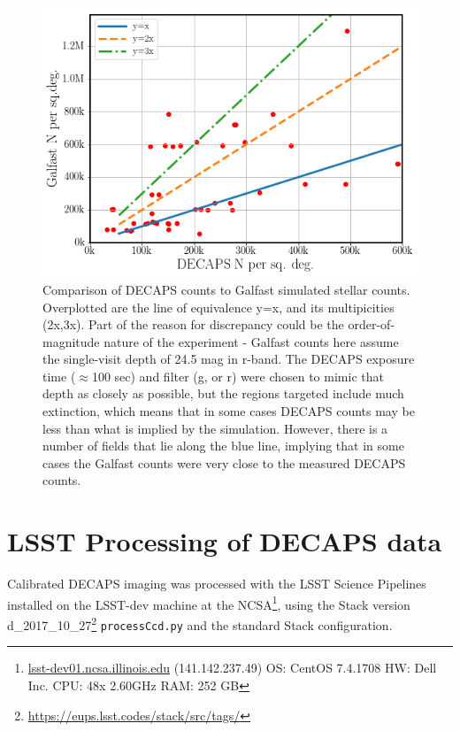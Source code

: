\documentclass[DM,lsstdraft,toc,usenatbib]{lsstdoc}
\begin{document}
\begin{figure}
\centering
\includegraphics[width=0.75\columnwidth]{figs/MAF_DECAPS_comparison.png}
\caption{Comparison of DECAPS counts to Galfast simulated stellar counts.  Overplotted are the line of equivalence y=x, and its multipicities (2x,3x). Part of the reason for discrepancy could be the order-of-magnitude nature of the experiment - Galfast counts here assume the single-visit depth of 24.5 mag in r-band. The DECAPS exposure time ($\approx$100 sec) and filter (g, or r) were chosen to mimic that depth as closely as possible, but the regions targeted include much extinction, which means that in some cases DECAPS counts may be less than what is  implied by the simulation. However, there is a number of fields that lie along the blue line, implying that in some cases the Galfast counts were very close to the measured DECAPS counts.}
\label{fig:maf_decaps_counts}
\end{figure} 


\section{LSST Processing of DECAPS data}
\label{sec:LSST}
Calibrated DECAPS imaging was processed with the LSST Science Pipelines installed on the LSST-dev machine at the NCSA\footnote{\url{lsst-dev01.ncsa.illinois.edu} (141.142.237.49) OS: CentOS 7.4.1708   HW: Dell Inc. CPU: 48x 2.60GHz RAM: 252 GB}, using the Stack version d\_2017\_10\_27\footnote{\url{https://eups.lsst.codes/stack/src/tags/}} \verb|processCcd.py| and the standard Stack configuration. 
\end{document}
